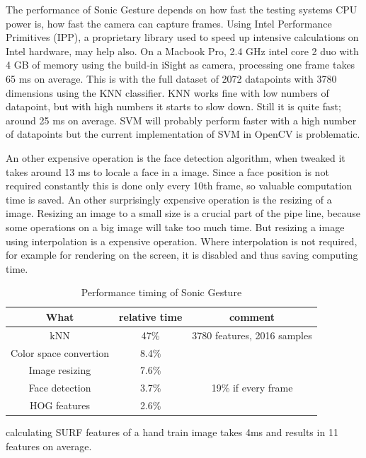 The performance of Sonic Gesture depends on how fast the testing systems CPU power is, how fast the camera can capture frames. Using Intel Performance Primitives (IPP), a proprietary library used to speed up intensive calculations on Intel hardware, may help also. On a Macbook Pro, 2.4 GHz intel core 2 duo with 4 GB of memory using the build-in iSight as camera, processing one frame takes 65 ms on average. This is with the full dataset of 2072 datapoints with 3780 dimensions using the KNN classifier. KNN works fine with low numbers of datapoint, but with high numbers it starts to slow down. Still it is quite fast; around 25 ms on average. SVM will probably perform faster with a high number of datapoints but the current implementation of SVM in OpenCV is problematic.

An other expensive operation is the face detection algorithm, when tweaked it takes around 13 ms to locale a face in a image. Since a face position is not required constantly this is done only every 10th frame, so valuable computation time is saved. An other surprisingly expensive operation is the resizing of a image. Resizing an image to a small size is a crucial part of the pipe line, because some operations on a big image will take too much time. But resizing a image using interpolation is a expensive operation. Where interpolation is not required, for example for rendering on the screen, it is disabled and thus saving computing time. 



\begin{table}
\centering
\begin{tabular}{ccc}
What & relative time & comment \\
\hline
kNN & 47\% & 3780 features, 2016 samples \\
Color space convertion & 8.4\% & \\
Image resizing & 7.6\% & \\
Face detection & 3.7\% &  19\% if every frame \\
HOG features & 2.6\% \\
\end{tabular}
\caption{Performance timing of Sonic Gesture}
\end{table}

calculating SURF features of a hand train image takes 4ms and results in 11 features on average.